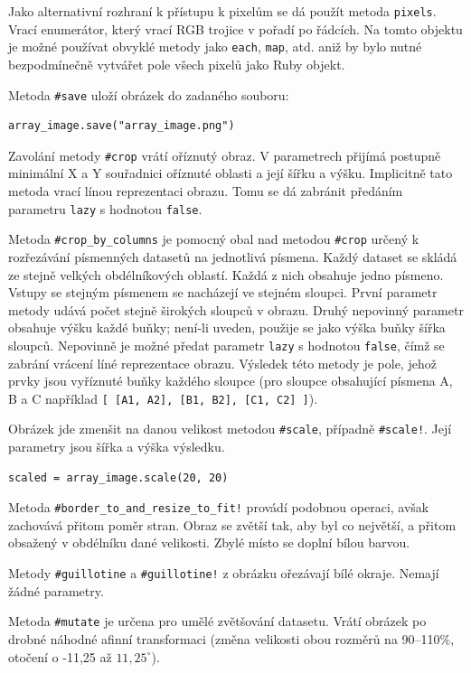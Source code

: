 \documentclass[a4paper]{article}
\begin{document}
Jako alternativní rozhraní k přístupu k pixelům se dá použít metoda
\texttt{pixels}. Vrací enumerátor, který vrací RGB trojice v pořadí
po řádcích. Na tomto objektu je možné používat obvyklé metody jako
\texttt{each}, \texttt{map}, atd. aniž by bylo nutné bezpodmínečně
vytvářet pole všech pixelů jako Ruby objekt.

Metoda \texttt{\#save} uloží obrázek do zadaného souboru:
\begin{lstlisting}
array_image.save("array_image.png")
\end{lstlisting}

Zavolání metody \texttt{\#crop} vrátí oříznutý obraz. V parametrech přijímá
postupně minimální X a Y souřadnici oříznuté oblasti a její šířku a výšku.
Implicitně tato metoda vrací línou reprezentaci obrazu. Tomu se dá zabránit
předáním parametru \texttt{lazy} s hodnotou \texttt{false}.

Metoda \texttt{\#crop\_by\_columns} je pomocný obal nad metodou \texttt{\#crop}
určený k rozřezávání písmenných datasetů na jednotlivá písmena. Každý dataset
se skládá ze stejně velkých obdélníkových oblastí. Každá z nich obsahuje jedno
písmeno. Vstupy se stejným písmenem se nacházejí ve stejném sloupci.
První parametr metody udává počet stejně širokých sloupců v obrazu.
Druhý nepovinný parametr obsahuje výšku každé buňky; není-li uveden, použije
se jako výška buňky šířka sloupců. Nepovinně je možné předat parametr
\texttt{lazy} s hodnotou \texttt{false}, čímž se zabrání vrácení líné
reprezentace obrazu. Výsledek této metody je pole, jehož prvky jsou vyříznuté
buňky každého sloupce (pro sloupce obsahující písmena A, B a C například
\texttt{[ [A1, A2], [B1, B2], [C1, C2] ]}).

Obrázek jde zmenšit na danou velikost metodou \texttt{\#scale}, případně
\texttt{\#scale!}. Její parametry jsou šířka a výška výsledku.
\begin{lstlisting}
scaled = array_image.scale(20, 20)
\end{lstlisting}
Metoda \texttt{\#border\_to\_and\_resize\_to\_fit!} provádí podobnou operaci,
avšak zachovává přitom poměr stran. Obraz se zvětší tak, aby byl co největší,
a přitom obsažený v obdélníku dané velikosti. Zbylé místo se doplní bílou
barvou.

Metody \texttt{\#guillotine} a \texttt{\#guillotine!} z obrázku ořezávají
bílé okraje. Nemají žádné parametry.

Metoda \texttt{\#mutate} je určena pro umělé zvětšování datasetu. Vrátí obrázek
po drobné náhodné afinní transformaci (změna velikosti obou rozměrů na 90--110\%,
otočení o -11,25 až $11,25^\circ$).
\end{document}
